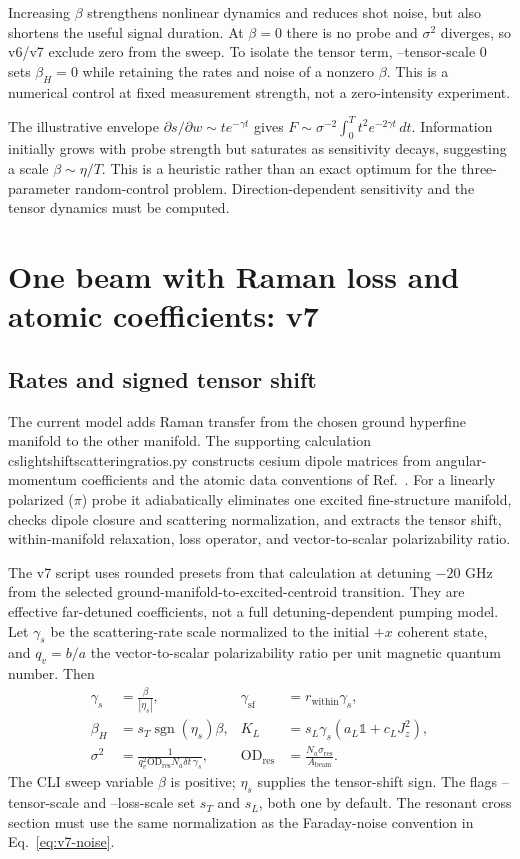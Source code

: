 \documentclass[11pt]{article}
\newcommand{\dt}{\delta t}
\newcommand{\id}{\mathbb{1}}
\newcommand{\OD}{\mathrm{OD}}
\newcommand{\code}[1]{{\small\ttfamily\def\_{\textunderscore\allowbreak}#1}}
\begin{document}
Increasing $\beta$ strengthens nonlinear dynamics and reduces shot noise, but
also shortens the useful signal duration. At $\beta=0$ there is no probe and
$\sigma^2$ diverges, so v6/v7 exclude zero from the sweep. To isolate the tensor
term, \code{--tensor-scale 0} sets $\beta_H=0$ while retaining the rates and
noise of a nonzero $\beta$. This is a numerical control at fixed measurement
strength, not a zero-intensity experiment.

The illustrative envelope $\partial s/\partial w\sim t e^{-\gamma t}$ gives
$F\sim\sigma^{-2}\int_0^T t^2e^{-2\gamma t}\,dt$. Information initially grows
with probe strength but saturates as sensitivity decays, suggesting a scale
$\beta\sim\eta/T$. This is a heuristic rather than an exact optimum for the
three-parameter random-control problem. Direction-dependent sensitivity and
the tensor dynamics must be computed.

\section{One beam with Raman loss and atomic coefficients: v7}
\label{sec:loss}

\subsection{Rates and signed tensor shift}

The current model adds Raman transfer from the chosen ground hyperfine manifold
to the other manifold. The supporting calculation
\code{cs\_light\_shift\_scattering\_ratios.py} constructs cesium dipole matrices
from angular-momentum coefficients and the atomic data conventions of
Ref.~\cite{steck}. For a linearly polarized ($\pi$) probe it adiabatically
eliminates one excited fine-structure manifold, checks dipole closure and
scattering normalization, and extracts the tensor shift, within-manifold
relaxation, loss operator, and vector-to-scalar polarizability ratio.

The v7 script uses rounded presets from that calculation at detuning $-20$ GHz
from the selected ground-manifold-to-excited-centroid transition. They are
effective far-detuned coefficients, not a full detuning-dependent pumping model.
Let $\gamma_s$ be the scattering-rate scale normalized to the initial $+x$
coherent state, and $q_v=b/a$ the vector-to-scalar polarizability ratio per unit
magnetic quantum number. Then
\begin{align}
 \gamma_s&=\frac{\beta}{|\eta_s|},&
 \gamma_{\mathrm{sf}}&=r_{\mathrm{within}}\gamma_s,\\
 \beta_H&=s_T\operatorname{sgn}(\eta_s)\beta,&
 K_L&=s_L\gamma_s(a_L\id+c_LJ_z^2),
 \label{eq:v7-rates}\\
 \sigma^2&=\frac{1}{q_v^2\OD_{\mathrm{res}}N_a\dt\,\gamma_s},&
 \OD_{\mathrm{res}}&=\frac{N_a\sigma_{\mathrm{res}}}{A_{\mathrm{beam}}}.
 \label{eq:v7-noise}
\end{align}
The CLI sweep variable $\beta$ is positive; $\eta_s$ supplies the tensor-shift
sign. The flags \code{--tensor-scale} and \code{--loss-scale} set $s_T$ and
$s_L$, both one by default. The resonant cross section must use the same
normalization as the Faraday-noise convention in Eq.~\eqref{eq:v7-noise}.
\end{document}
